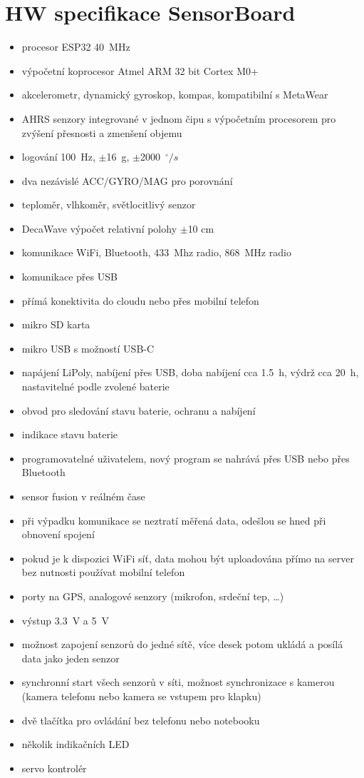 \documentclass[12pt,a4paper]{article}
\begin{document}
\section{HW specifikace SensorBoard}
\begin{itemize}
	\item procesor ESP32 40~MHz
	\item výpočetní koprocesor Atmel ARM 32 bit Cortex M0+
	\item akcelerometr, dynamický gyroskop, kompas, kompatibilní s MetaWear
	\item AHRS senzory integrované v jednom čipu s výpočetním procesorem pro zvýšení přesnosti a zmenšení objemu
	\item logování 100~Hz, $\pm$16~g, $\pm$2000~$^{\circ}/s$
	\item dva nezávislé ACC/GYRO/MAG pro porovnání
	\item teploměr, vlhkoměr, světlocitlivý senzor
	\item DecaWave výpočet relativní polohy $\pm$10 cm
	\item komunikace WiFi, Bluetooth, 433~Mhz radio, 868~MHz radio
	\item komunikace přes USB
	\item přímá konektivita do cloudu nebo přes mobilní telefon
	\item mikro SD karta
	\item mikro USB s možností USB-C
	\item napájení LiPoly, nabíjení přes USB, doba nabíjení cca 1.5~h, výdrž cca 20~h, nastavitelné podle zvolené baterie
	\item obvod pro sledování stavu baterie, ochranu a nabíjení
	\item indikace stavu baterie
	\item programovatelné uživatelem, nový program se nahrává přes USB nebo přes Bluetooth
	\item sensor fusion v reálném čase
	\item při výpadku komunikace se neztratí měřená data, odešlou se hned při obnovení spojení
	\item pokud je k dispozici WiFi síť, data mohou být uploadována přímo na server bez nutnosti používat mobilní telefon
	\item porty na GPS, analogové senzory (mikrofon, srdeční tep, \dots)
	\item výstup 3.3~V a 5~V
	\item možnost zapojení senzorů do jedné sítě, více desek potom ukládá a posílá data jako jeden senzor
	\item synchronní start všech senzorů v síti, možnost synchronizace s kamerou (kamera telefonu nebo kamera se vstupem pro klapku)
	\item dvě tlačítka pro ovládání bez telefonu nebo notebooku
	\item několik indikačních LED
	\item servo kontrolér
\end{itemize}
\end{document}
